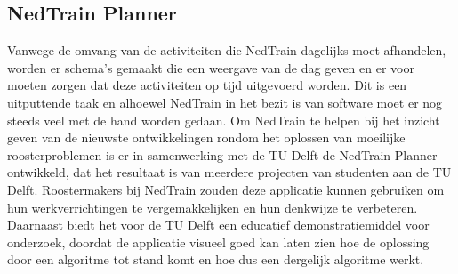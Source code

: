 \subsection{NedTrain Planner}
Vanwege de omvang van de activiteiten die NedTrain dagelijks moet afhandelen, worden er schema's gemaakt die een weergave van de dag geven en er voor moeten zorgen dat deze activiteiten op tijd uitgevoerd worden. Dit is een uitputtende taak en alhoewel NedTrain in het bezit is van software moet er nog steeds veel met de hand worden gedaan. Om NedTrain te helpen bij het inzicht geven van de nieuwste ontwikkelingen rondom het oplossen van moeilijke roosterproblemen is er in samenwerking met de TU Delft de NedTrain Planner ontwikkeld, dat het resultaat is van meerdere projecten van studenten aan de TU Delft. Roostermakers bij NedTrain zouden deze applicatie kunnen gebruiken om hun werkverrichtingen te vergemakkelijken en hun denkwijze te verbeteren. Daarnaast biedt het voor de TU Delft een educatief demonstratiemiddel voor onderzoek, doordat de applicatie visueel goed kan laten zien hoe de oplossing door een algoritme tot stand komt en hoe dus een dergelijk algoritme werkt.
